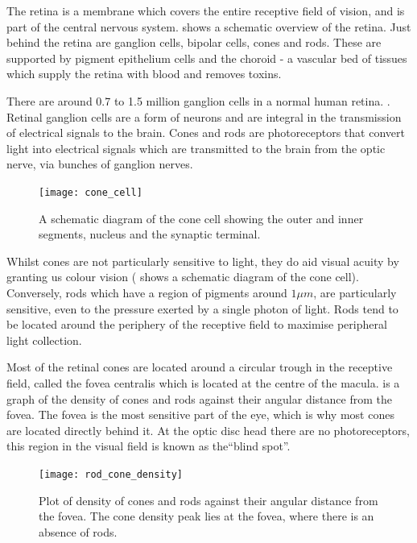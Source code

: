 The retina is a membrane which covers the entire receptive field of
vision, and is part of the central nervous system.\cite{rogers1983neurite}
 shows a schematic overview of the retina. Just behind the
retina are ganglion cells, bipolar cells, cones and rods. These are supported
by pigment epithelium cells and the choroid - a vascular bed of tissues which
supply the retina with blood and removes toxins. \cite{lutty1996localization} 

There are around 0.7 to 1.5 million ganglion cells in a normal human retina.
\cite{curcio1990topography}. Retinal ganglion cells are a form of neurons
and are integral in the transmission of electrical signals to the brain.
\cite{meyer1995characterization} Cones and rods are photoreceptors
that convert light into electrical signals which are transmitted to the
brain from the optic nerve, via bunches of ganglion nerves.

\begin{figure}[H]
\centering
  \texttt{[image: cone\_cell]}
\caption{A schematic diagram of the cone cell showing the outer and inner
segments, nucleus and the synaptic terminal.\cite{wikicone}}
\label{fig:cone}
\end{figure}

Whilst cones are not particularly sensitive to light, they do aid visual
acuity by granting us colour vision ( shows a schematic
diagram of the cone cell).\cite{bowmaker1980visual} Conversely, rods
which have a region of pigments around $1\mu{m}$, are particularly
sensitive, even to the pressure exerted by a single photon of light.
Rods tend to be located around the periphery of the receptive field to
maximise peripheral light collection.
\cite{liebman1964sensitive,baylor1979responses}

Most of the retinal cones are located around a circular trough in the
receptive field, called the fovea centralis which is located at the centre
of the macula.\cite{hendrickson1994primate}
 is a graph of the density of cones and rods
against their angular distance from the fovea. The fovea is the most
sensitive part of the eye, which is why most cones are located directly
behind it. At the optic disc head there are no photoreceptors, this region
in the visual field is known as the\enquote{blind spot}.

\begin{figure}[H]
\centering
  \texttt{[image: rod\_cone\_density]}
\caption{Plot of density of cones and rods against their angular distance from
the fovea. The cone density peak lies at the fovea, where there is an absence
of rods.\cite{rod_cone_density}}
\label{fig:rod_cone_density}
\end{figure}

